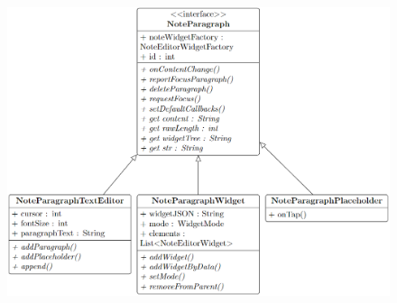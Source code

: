 








\begin{figure}[ht]
    \centering
    \includegraphics[width=\linewidth]{images/UML_klas.png}
    \label{fig:uml}
\end{figure}

\newpage

